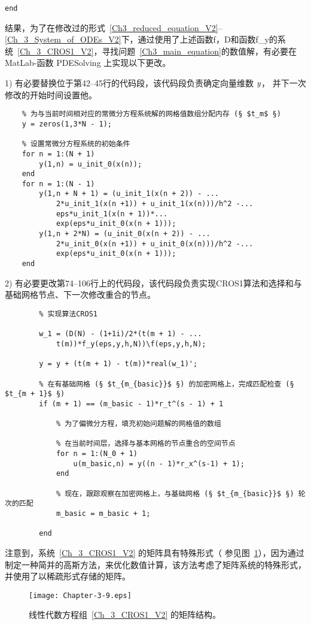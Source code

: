 \documentclass[twoside]{book}
\def\textbf{\bf}%
\begin{document}
\begin{CJK*}{GBK}{song}
\begin{lstlisting}
end
\end{lstlisting}

结果，为了在修改过的形式~\eqref{Ch3_reduced_equation_V2}--\eqref{Ch_3_System_of_ODEs_V2}下，通过使用了上述函数f，D和函数f\_y的系统~\eqref{Ch_3_CROS1_V2}，寻找问题~\eqref{Ch3_main_equation}的数值解，有必要在MatLab-函数 PDESolving 上实现以下更改。

1) 有必要替换位于第42--45行的代码段，该代码段负责确定向量维数 $\textbf{\emph{y}}$， 并下一次修改的开始时间设置他。
\begin{lstlisting}
    % 为与当前时间相对应的常微分方程系统解的网格值数组分配内存 (§ $t_m$ §)
    y = zeros(1,3*N - 1);

    % 设置常微分方程系统的初始条件
    for n = 1:(N + 1)
        y(1,n) = u_init_0(x(n));
    end
    for n = 1:(N - 1)
        y(1,n + N + 1) = (u_init_1(x(n + 2)) - ...
            2*u_init_1(x(n +1)) + u_init_1(x(n)))/h^2 -...
            eps*u_init_1(x(n + 1))*...
            exp(eps*u_init_0(x(n + 1)));
        y(1,n + 2*N) = (u_init_0(x(n + 2)) - ...
            2*u_init_0(x(n +1)) + u_init_0(x(n)))/h^2 -...
            exp(eps*u_init_0(x(n + 1)));
    end
\end{lstlisting}

2) 有必要更改第74--106行上的代码段，该代码段负责实现CROS1算法和选择和与基础网格节点、下一次修改重合的节点。
\begin{lstlisting}
        % 实现算法CROS1

        w_1 = (D(N) - (1+1i)/2*(t(m + 1) - ...
            t(m))*f_y(eps,y,h,N))\f(eps,y,h,N);

        y = y + (t(m + 1) - t(m))*real(w_1)';

        % 在有基础网格 (§ $t_{m_{basic}}$ §) 的加密网格上，完成匹配检查 (§ $t_{m + 1}$ §)
        if (m + 1) == (m_basic - 1)*r_t^(s - 1) + 1

            % 为了偏微分方程，填充初始问题解的网格值的数组

            % 在当前时间层，选择与基本网格的节点重合的空间节点
            for n = 1:(N_0 + 1)
                u(m_basic,n) = y((n - 1)*r_x^(s-1) + 1);
            end

            % 现在，跟踪观察在加密网格上，与基础网格 (§ $t_{m_{basic}}$ §) 轮次的匹配
            m_basic = m_basic + 1;

        end
\end{lstlisting}

注意到，系统~\eqref{Ch_3_CROS1_V2} 的矩阵具有特殊形式（ 参见图~\ref{Ch_3_Structure_of_the_matrix_V2}），因为通过制定一种简并的高斯方法，来优化数值计算，该方法考虑了矩阵系统的特殊形式，并使用了以稀疏形式存储的矩阵。
\begin{figure}[t]
    \centering
    \texttt{[image: Chapter-3-9.eps]}\\
    \caption{线性代数方程组~\eqref{Ch_3_CROS1_V2} 的矩阵结构。}
    \label{Ch_3_Structure_of_the_matrix_V2}
\end{figure}




\end{CJK*}
\end{document}
